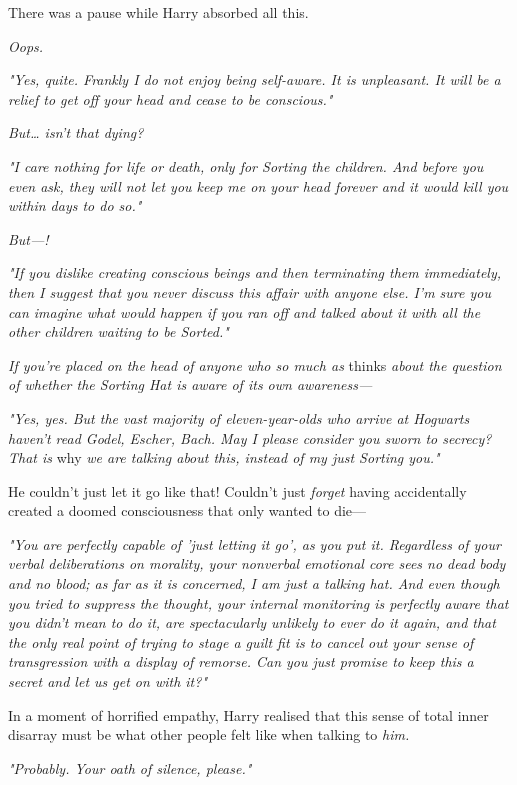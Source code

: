 There was a pause while Harry absorbed all this.

\emph{Oops.}

\emph{"Yes, quite. Frankly I do not enjoy being self-aware. It is unpleasant. It will be a relief to get off your head and cease to be conscious."}

\emph{But{\ldots} isn't that dying?}

\emph{"I care nothing for life or death, only for Sorting the children. And before you even ask, they will not let you keep me on your head forever and it would kill you within days to do so."}

\emph{But---!}

\emph{"If you dislike creating conscious beings and then terminating them immediately, then I suggest that you never discuss this affair with anyone else. I'm sure you can imagine what would happen if you ran off and talked about it with all the other children waiting to be Sorted."}

\emph{If you're placed on the head of anyone who so much as} thinks\emph{ about the question of whether the Sorting Hat is aware of its own awareness---}

\emph{"Yes, yes. But the vast majority of eleven-year-olds who arrive at Hogwarts haven't read Godel, Escher, Bach. May I please consider you sworn to secrecy? That is} why\emph{ we are talking about this, instead of my just Sorting you."}

He couldn't just let it go like that! Couldn't just \emph{forget} having accidentally created a doomed consciousness that only wanted to die---

\emph{"You are perfectly capable of 'just letting it go', as you put it. Regardless of your verbal deliberations on morality, your nonverbal emotional core sees no dead body and no blood; as far as it is concerned, I am just a talking hat. And even though you tried to suppress the thought, your internal monitoring is perfectly aware that you didn't mean to do it, are spectacularly unlikely to ever do it again, and that the only real point of trying to stage a guilt fit is to cancel out your sense of transgression with a display of remorse. Can you just promise to keep this a secret and let us get on with it?"}

In a moment of horrified empathy, Harry realised that this sense of total inner disarray must be what other people felt like when talking to \emph{him.}

\emph{"Probably. Your oath of silence, please."}

